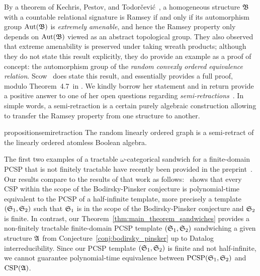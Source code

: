  By a theorem of Kechris, Pestov, and Todor\v{c}evi\'c~\cite{kechris2005fraisse}, a homogeneous structure $\mathfrak{B}$ with a countable relational signature is Ramsey if and only if its automorphism group $\mathrm{Aut}(\mathfrak{B})$ is \emph{extremely amenable}, and hence the Ramsey property only depends on $\mathrm{Aut}(\mathfrak{B})$ viewed as an abstract topological group.  
%
They also observed that extreme amenability is preserved under taking wreath products; although they do not state this result explicitly, they do provide an example as a proof of concept: the automorphism group of the \emph{random convexly ordered equivalence relation}.  
 Scow~\cite[Theorem~5.13]{scow2021ramsey} does state this result, and essentially provides a full proof, modulo Theorem~4.7~in \cite{kechris2005fraisse}.
 We kindly borrow her statement and in return provide a positive answer to one of her open questions regarding \emph{semi-retractions}~\cite[Question 4.3]{BARTOŠOVÁ_SCOW_2024}.
 In simple words, a semi-retraction is a certain purely algebraic construction allowing to transfer   the Ramsey property from one structure to another.   

\begin{restatable}{proposition}{semiretraction} \label{prop:rg_semiret_aba} 
  The random linearly ordered graph is a semi-retract of the linearly ordered atomless Boolean algebra. %
 \end{restatable}
 
 The first two examples of a tractable $\omega$-categorical sandwich for a finite-domain PCSP that is not finitely tractable have  recently been provided in the preprint~\cite[Propositions~35 and~36]{Mottet_2025}. Our results compare to the results of that work as follows:~\cite[Theorem 1]{Mottet_2025}  shows that every CSP within the scope of the Bodirsky-Pinsker conjecture is polynomial-time equivalent to the PCSP of a half-infinite template, more precisely a template $(\mathfrak{S}_1,\mathfrak{S}_2)$ such that $\mathfrak{S}_1$ is in the scope of the Bodirsky-Pinsker conjecture and $\mathfrak{S}_2$ is finite.
%
In contrast, our Theorem~\ref{thm:main_theorem_sandwiches} provides a non-finitely tractable finite-domain PCSP template $(\mathfrak{S}_1,\mathfrak{S}_2)$ sandwiching a given structure $\mathfrak{A}$ from Conjecture~\ref{conj:bodirsky_pinsker} up to Datalog interreducibility.
%
Since our PCSP template $(\mathfrak{S}_1,\mathfrak{S}_2)$ is finite and not half-infinite, we cannot guarantee polynomial-time equivalence between $\mathrm{PCSP}(\mathfrak{S}_1,\mathfrak{S}_2)$ and $\mathrm{CSP}(\mathfrak{A})$. 

